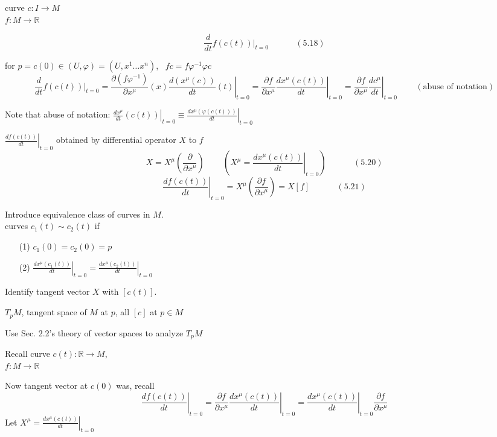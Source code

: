 \documentclass[twoside]{amsart}
\begin{document}
curve $c:I \to M$ \\
\phantom{curve } $f:M \to \mathbb{R}$ 

\[
\frac{d}{dt} \left. f(c(t)) \right|_{t=0} \quad \quad \quad \, (5.18)
\]

for $p = c(0) \in (U, \varphi) = (U, x^1 \dots x^n)$, \, $fc = f\varphi^{-1}\varphi c$
\[
\frac{d}{dt} \left. f(c(t)) \right|_{t=0} =   \frac{ \partial (f\varphi^{-1}) }{ \partial x^{\mu} }(x) \left. \frac{ d (x^{\mu}(c)) }{ dt}(t) \right|_{t=0} = \frac{ \partial f}{ \partial x^{\mu}} \left. \frac{dx^{\mu}(c(t)) }{dt} \right|_{t=0} = \left. \frac{ \partial f}{ \partial x^{\mu} } \frac{d c^{\mu}}{dt} \right|_{t=0} \quad \quad \, (\text{abuse of notation})
\]

Note that abuse of notation: $ \left. \frac{ dx^{\mu} }{dt}(c(t)) \right|_{t=0 } \equiv \left. \frac{d x^{\mu} ( \varphi{ (c(t))  }) }{dt} \right|_{t=0}$

$ \left. \frac{df(c(t))}{dt} \right|_{t=0}$ obtained by differential operator $X$ to $f$
\[
X = X^{\mu}\left( \frac{ \partial }{ \partial x^{\mu} } \right) \quad \quad \, \left( X^{\mu} = \left. \frac{dx^{\mu}(c(t))}{dt} \right|_{t=0} \right) \quad \quad \quad \, (5.20)
\]
\[
\left. \frac{df(c(t))}{ dt} \right|_{t=0} = X^{\mu} \left( \frac{ \partial f}{ \partial x^{\mu} } \right) = X[f] \quad \quad \quad \, (5.21)
\]



Introduce equivalence class of curves in $M$.  \\
curves $c_1(t) \sim c_2(t)$ if 
\begin{enumerate}
\item[(1)] $c_1(0) = c_2(0) = p$ 
\item[(2)] $
\left. \frac{dx^{\mu}{ (c_1(t)) } }{ dt} \right|_{t=0} = \left. \frac{dx^{\mu}(c_2(t)) }{ dt} \right|_{t=0}
$
\end{enumerate}

Identify tangent vector $X$ with $[c(t)]$.  

$T_p M$, tangent space of $M$ at $p$, all $[c]$ at $p \in M$ 

Use Sec. 2.2's theory of vector spaces to analyze $T_pM$ 

\hrulefill

Recall curve $c(t) : \mathbb{R} \to M$,  \\
\phantom{Recall curve }  $f: M \to \mathbb{R}$

Now tangent vector at $c(0)$ was, recall
\[
\left. \frac{df(c(t))}{ dt} \right|_{t=0} = \frac{ \partial f}{ \partial x^{\mu}}  \left. \frac{ dx^{\mu}(c(t))}{ dt} \right|_{t=0} = \left. \frac{dx^{\mu}(c(t))}{ dt} \right|_{t=0} \frac{ \partial f}{ \partial x^{\mu} }
\]
Let $X^{\mu} = \left. \frac{dx^{\mu}(c(t))}{ dt} \right|_{t=0}$
\end{document}
